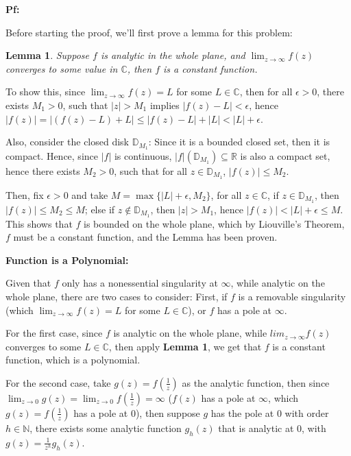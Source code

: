 \documentclass{article}
\newtheorem{lemma}{Lemma}
\begin{document}
\textbf{Pf:}

Before starting the proof, we'll first prove a lemma for this problem:

\begin{lemma}
    Suppose $f$ is analytic in the whole plane, and $\lim_{z\rightarrow\infty}f(z)$ converges to some value in $\mathbb{C}$, then $f$ is a constant function.
\end{lemma}

To show this, since $\lim_{z\rightarrow\infty}f(z)=L$ for some $L\in\mathbb{C}$, then for all $\epsilon>0$, there exists $M_1>0$,
such that $|z|>M_1$ implies $|f(z)-L|<\epsilon$, hence $|f(z)|=|(f(z)-L)+L| \leq |f(z)-L|+|L| < |L|+\epsilon$.

Also, consider the closed disk $\mathbb{D}_{M_1}$: Since it is a bounded closed set, then it is compact. Hence, since $|f|$ is continuous,
$|f|(\mathbb{D}_{M_1})\subseteq \mathbb{R}$ is also a compact set, hence there exists $M_2>0$, such that for all $z\in\mathbb{D}_{M_1}$,
$|f(z)| \leq M_2$.

Then, fix $\epsilon>0$ and take $M=\max\{|L|+\epsilon,M_2\}$, for all $z\in\mathbb{C}$, if $z\in\mathbb{D}_{M_1}$, then $|f(z)|\leq M_2\leq M$; else if $z\notin \mathbb{D}_{M_1}$,
then $|z|>M_1$, hence $|f(z)| < |L|+\epsilon \leq M$. This shows that $f$ is bounded on the whole plane,
which by Liouville's Theorem, $f$ must be a constant function, and the Lemma has been proven.

\hfill

\textbf{Function is a Polynomial:}

Given that $f$ only has a nonessential singularity at $\infty$, while analytic on the whole plane, there are two cases to consider: First, if $f$ is a removable singularity (which $\lim_{z\rightarrow\infty}f(z)=L$ for some $L\in\mathbb{C}$),
or $f$ has a pole at $\infty$.

\hfill

For the first case, since $f$ is analytic on the whole plane, while $lim_{z\rightarrow\infty}f(z)$ converges to some $L\in\mathbb{C}$, then apply \textbf{Lemma 1},
we get that $f$ is a constant function, which is a polynomial.

\hfill

For the second case, take $g(z)=f(\frac{1}{z})$ as the analytic function, then since $\lim_{z\rightarrow 0}g(z)= \lim_{z\rightarrow 0}f(\frac{1}{z})=\infty$ ($f(z)$ has a pole at $\infty$, which $g(z)=f(\frac{1}{z})$ has a pole at $0$),
then suppose $g$ has the pole at $0$ with order $h\in\mathbb{N}$, there exists some analytic function $g_h(z)$ that is analytic at $0$,
with $g(z)=\frac{1}{z^h}g_h(z)$.
\end{document}
